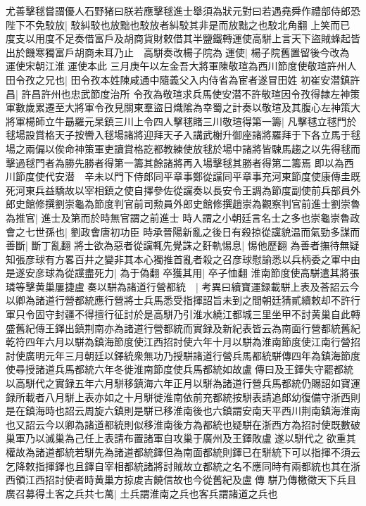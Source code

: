 尤善擊毬嘗謂優人石野猪曰朕若應擊毬進士舉須為狀元對曰若遇堯舜作禮部侍郎恐陛下不免駮放|{
	駮糾駮也放黜也駮放者糾駮其非是而放黜之也駮北角翻}
上笑而已　度支以用度不足奏借富戶及胡商貨財敕借其半鹽鐵轉運使高駢上言天下盜賊蜂起皆出於饑寒獨富戶胡商未耳乃止　高駢奏改楊子院為運使|{
	楊子院舊置留後今改為運使宋朝江淮運使本此}
三月庚午以左金吾大將軍陳敬瑄為西川節度使敬瑄許州人田令孜之兄也|{
	田令孜本姓陳咸通中隨義父入内侍省為宦者遂冒田姓}
初崔安潜鎮許昌|{
	許昌許州也忠武節度治所}
令孜為敬瑄求兵馬使安潜不許敬瑄因令孜得隸左神策軍數歲累遷至大將軍令孜見關東羣盜日熾隂為幸蜀之計奏以敬瑄及其腹心左神策大將軍楊師立牛朂羅元杲鎮三川上令四人擊毬賭三川敬瑄得第一籌|{
	凡擊毬立毬門於毬場設賞格天子按轡入毬場諸將迎拜天子入講武榭升御座諸將羅拜于下各立馬于毬場之兩偏以俟命神策軍吏讀賞格訖都教練使放毬於場中諸將皆駷馬趨之以先得毬而擊過毬門者為勝先勝者得第一籌其餘諸將再入場擊毬其勝者得第二籌焉}
即以為西川節度使代安潜　辛未以門下侍郎同平章事鄭從讜同平章事充河東節度使康傳圭既死河東兵益驕故以宰相鎮之使自擇參佐從讜奏以長安令王調為節度副使前兵部員外郎史館修撰劉崇龜為節度判官前司勲員外郎史館修撰趙崇為觀察判官前進士劉崇魯為推官|{
	進士及第而於時無官謂之前進士}
時人謂之小朝廷言名士之多也崇龜崇魯政會之七世孫也|{
	劉政會唐初功臣}
時承晉陽新亂之後日有殺掠從讜貌温而氣勁多謀而善斷|{
	斷丁亂翻}
將士欲為惡者從讜輒先覺誅之姧軌惕息|{
	惕他歷翻}
為善者撫待無疑知張彦球有方畧百井之變非其本心獨推首亂者殺之召彦球慰諭悉以兵柄委之軍中由是遂安彦球為從讜盡死力|{
	為于偽翻}
卒獲其用|{
	卒子恤翻}
淮南節度使高駢遣其將張璘等擊黄巢屢捷盧奏以駢為諸道行營都統　|{
	考異曰續寶運録載駢上表及荅詔云今以卿為諸道行營都統應行營將士兵馬悉受指揮詔旨未到之間朝廷猜貳續敕却不許行軍只令固守封疆不得擅行征討於是高駢乃引淮水繞江都城三里坐甲不討黄巢自此轉盛舊紀傳王鐸出鎮荆南亦為諸道行營都統而實録及新紀表皆云為南面行營都統舊紀乾符四年六月以駢為鎮海節度使江西招討使六年十月以駢為淮南節度使江南行營招討使廣明元年三月朝廷以鐸統衆無功乃授駢諸道行營兵馬都統駢傳四年為鎮海節度使尋授諸道兵馬都統六年冬徙淮南節度使兵馬都統如故盧傳曰及王鐸失守罷都統以高駢代之實録五年六月駢移鎮海六年正月以駢為諸道行營兵馬都統仍賜詔如寶運録所載者八月駢上表亦如之十月駢徙淮南依前充都統按駢表請追郎幼復備守浙西則是在鎮海時也詔云周旋六鎮則是駢已移淮南後也六鎮謂安南天平西川荆南鎮海淮南也又詔云今以卿為諸道都統則似移淮南後方為都統也疑駢在浙西方為招討使既數破巢軍乃以滅巢為己任上表請布置諸軍自攻巢于廣州及王鐸敗盧遂以駢代之欲重其權故為諸道都統若駢先為諸道都統鐸但為南面都統則鐸已在駢統下可以指揮不須云乞降敕指揮鐸也且鐸自宰相都統諸將討賊故立都統之名不應同時有兩都統也其在浙西領江西招討使者時黄巢方掠䖍吉饒信故也今從舊紀及盧傳}
駢乃傳檄徵天下兵且廣召募得土客之兵共七萬|{
	土兵謂淮南之兵也客兵謂諸道之兵也}
